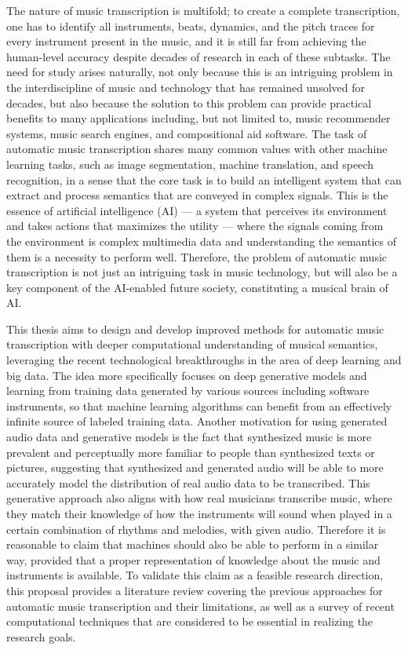 The nature of music transcription is multifold; to create a complete transcription, one has to identify all instruments, beats, dynamics, and the pitch traces for every instrument present in the music, and it is still far from achieving the human-level accuracy despite decades of research in each of these subtasks.
The need for study arises naturally, not only because this is an intriguing problem in the interdiscipline of music and technology that has remained unsolved for decades, but also because the solution to this problem can provide practical benefits to many applications including, but not limited to, music recommender systems, music search engines, and compositional aid software.
The task of automatic music transcription shares many common values with other machine learning tasks, such as image segmentation, machine translation, and speech recognition, in a sense that the core task is to build an intelligent system that can extract and process semantics that are conveyed in complex signals.
This is the essence of artificial intelligence (AI)
--- a system that perceives its environment and takes actions that maximizes the utility \cite{russell2009ai} --- 
where the signals coming from the environment is complex multimedia data and understanding the semantics of them is a necessity to perform well.
Therefore, the problem of automatic music transcription is not just an intriguing task in music technology, but will also be a key component of the AI-enabled future society, constituting a musical brain of AI.

This thesis aims to design and develop improved methods for automatic music transcription with deeper computational understanding of musical semantics, leveraging the recent technological breakthroughs in the area of deep learning and big data.
The idea more specifically focuses on deep generative models and learning from training data generated by various sources including software instruments, so that machine learning algorithms can benefit from an effectively infinite source of labeled training data.
Another motivation for using generated audio data and generative models is the fact that synthesized music is more prevalent and perceptually more familiar to people than synthesized texts or pictures, suggesting that synthesized and generated audio will be able to more accurately model the distribution of real audio data to be transcribed.
This generative approach also aligns with how real musicians transcribe music, where they match their knowledge of how the instruments will sound when played in a certain combination of rhythms and melodies, with given audio.
Therefore it is reasonable to claim that machines should also be able to perform in a similar way, provided that a proper representation of knowledge about the music and instruments is available.
To validate this claim as a feasible research direction, this proposal provides a literature review covering the previous approaches for automatic music transcription and their limitations, as well as a survey of recent computational techniques that are considered to be essential in realizing the research goals.


